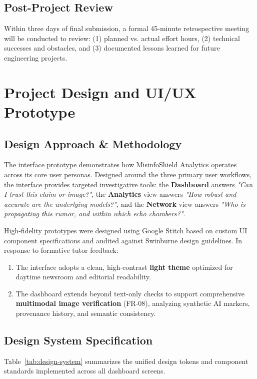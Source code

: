 \documentclass[11pt, a4paper]{article}
\begin{document}
\subsection{Post-Project Review}
Within three days of final submission, a formal 45-minute retrospective meeting will be conducted to review: (1) planned vs. actual effort hours, (2) technical successes and obstacles, and (3) documented lessons learned for future engineering projects.

\section{Project Design and UI/UX Prototype}
\label{sec:design-uiux}

\subsection{Design Approach \& Methodology}
The interface prototype demonstrates how MisinfoShield Analytics operates across its core user personas. Designed around the three primary user workflows, the interface provides targeted investigative tools: the \textbf{Dashboard} answers \emph{"Can I trust this claim or image?"}, the \textbf{Analytics} view answers \emph{"How robust and accurate are the underlying models?"}, and the \textbf{Network} view answers \emph{"Who is propagating this rumor, and within which echo chambers?"}.

High-fidelity prototypes were designed using Google Stitch based on custom UI component specifications and audited against Swinburne design guidelines. In response to formative tutor feedback:
\begin{enumerate}
  \item The interface adopts a clean, high-contrast \textbf{light theme} optimized for daytime newsroom and editorial readability.
  \item The dashboard extends beyond text-only checks to support comprehensive \textbf{multimodal image verification} (FR-08), analyzing synthetic AI markers, provenance history, and semantic consistency.
\end{enumerate}

\subsection{Design System Specification}
Table~\ref{tab:design-system} summarizes the unified design tokens and component standards implemented across all dashboard screens.
\end{document}
